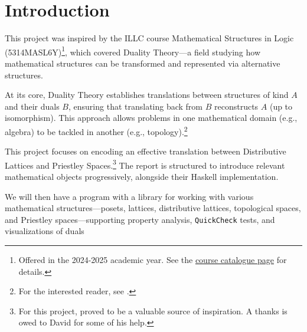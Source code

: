 \section{Introduction}
\label{sec:introduction}
This project was inspired by the ILLC course Mathematical Structures in Logic (5314MASL6Y)\footnote{Offered in the 2024-2025 academic year. See the \href{https://studiegids.uva.nl/xmlpages/page/2024-2025-en/search-course/course/118785}{course catalogue page} for details.}, which covered Duality Theory—a field studying how mathematical structures can be transformed and represented via alternative structures.

At its core, Duality Theory establishes translations between structures of kind $A$ and their duals $B$, ensuring that translating back from $B$ reconstructs $A$ (up to isomorphism). This approach allows problems in one mathematical domain (e.g., algebra) to be tackled in another (e.g., topology).\footnote{For the interested reader, see \cite{burrisCourseUniversalAlgebra2012, daveyIntroductionLatticesOrder2010, johnstoneStoneSpaces1992, kelleyGeneralTopology2007, munkresTopology2000}.}

This project focuses on encoding an effective translation between Distributive Lattices and Priestley Spaces.\footnote{For this project, \cite{quinnalvarezTopomodels2025} proved to be a valuable source of inspiration. A thanks is owed to David for some of his help.} The report is structured to introduce relevant mathematical objects progressively, alongside their Haskell implementation.

We will then have a program with a library for working with various mathematical structures—posets, lattices, distributive lattices, topological spaces, and Priestley spaces—supporting property analysis, \texttt{QuickCheck} tests, and visualizations of duals










